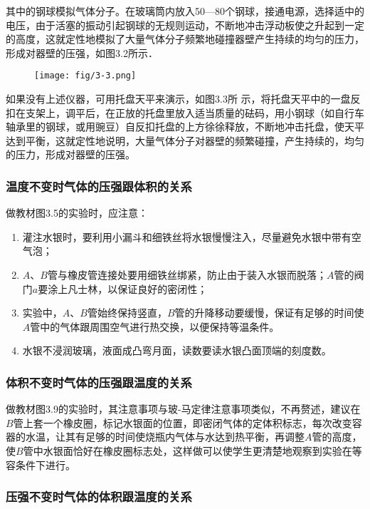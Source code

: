 其中的钢球模拟气体分子。在玻璃筒内放入50—80个钢球，接通电源，选择适中的电压，由于活塞的振动引起钢球的无规则运动，不断地冲击浮动板使之升起到一定的高度，这就定性地模拟了大量气体分子频繁地碰撞器壁产生持续的均匀的压力，形成对器壁的压强，如图3.2所示．

\begin{figure}[htp]
    \centering
\texttt{[image: fig/3-3.png]}
    \caption{}
\end{figure}

如果没有上述仪器，可用托盘天平来演示，如图3.3所
示，将托盘天平中的一盘反扣在支架上，调平后，在正放的托盘里放入适当质量的砝码，用小钢球（如自行车轴承里的钢球，或用豌豆）自反扣托盘的上方徐徐释放，不断地冲击托盘，使天平达到平衡，这就定性地说明，大量气体分子对器壁的频繁碰撞，产生持续的，均匀的压力，形成对器壁的压强。

\subsubsection{温度不变时气体的压强跟体积的关系}

做教材图3.5的实验时，应注意：
\begin{enumerate}
\item 灌注水银时，要利用小漏斗和细铁丝将水银慢慢注入，尽量避免水银中带有空气泡；
\item $A$、$B$管与橡皮管连接处要用细铁丝绑紧，防止由于装入水银而脱落；$A$管的阀门$a$要涂上凡士林，以保证良好的密闭性；
\item 实验中，$A$、$B$管始终保持竖直，$B$管的升降移动要缓慢，保证有足够的时间使$A$管中的气体跟周围空气进行热交换，以便保持等温条件。
\item 水银不浸润玻璃，液面成凸弯月面，读数要读水银凸面顶端的刻度数。
\end{enumerate}

\subsubsection{体积不变时气体的压强跟温度的关系}

做教材图3.9的实验时，其注意事项与玻-马定律注意事项类似，不再赘述，建议在$B$管上套一个橡皮圈，标记水银面的位置，即密闭气体的定体积标志，每次改变容器的水温，让其有足够的时间使烧瓶内气体与水达到热平衡，再调整$A$管的高度，使$B$管中水银面恰好在橡皮圈标志处，这样做可以使学生更清楚地观察到实验在等容条件下进行。

\subsubsection{压强不变时气体的体积跟温度的关系}

